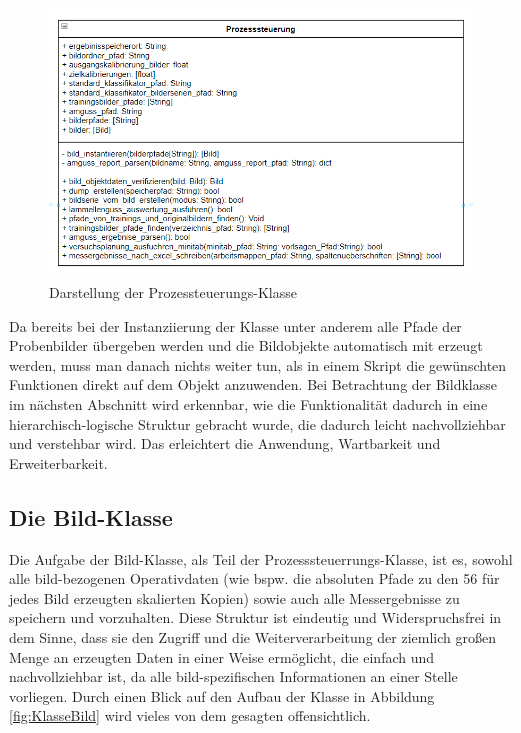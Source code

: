 \documentclass[
fontsize=10pt, 
listof = totoc,
parskip = half	
]{report}
\begin{document}
\begin{figure}[H]
	\centering
	\includegraphics[width=\textwidth, height=\textheight, keepaspectratio]{pics/class_runner}
	\caption{Darstellung der Prozessteuerungs-Klasse}
	\label{fig:KlasseProzessteuerung}
\end{figure}

\noindent Da bereits bei der Instanziierung der Klasse unter anderem alle Pfade der Probenbilder übergeben werden und die Bildobjekte automatisch mit erzeugt werden, muss man danach nichts weiter tun, als in einem Skript die gewünschten Funktionen direkt auf dem Objekt anzuwenden. Bei Betrachtung der Bildklasse im nächsten Abschnitt wird erkennbar, wie die Funktionalität dadurch in eine hierarchisch-logische Struktur gebracht wurde, die dadurch leicht nachvollziehbar und verstehbar wird. Das erleichtert die Anwendung, Wartbarkeit und Erweiterbarkeit.

\subsection{Die Bild-Klasse}

Die Aufgabe der Bild-Klasse, als Teil der Prozesssteuerrungs-Klasse, ist es, sowohl alle bild-bezogenen Operativdaten (wie bspw. die absoluten Pfade zu den 56 für jedes Bild erzeugten skalierten Kopien) sowie auch alle Messergebnisse zu speichern und vorzuhalten. Diese Struktur ist eindeutig und Widerspruchsfrei in dem Sinne, dass sie den Zugriff und die Weiterverarbeitung der ziemlich großen Menge an erzeugten Daten in einer Weise ermöglicht, die einfach und nachvollziehbar ist, da alle bild-spezifischen Informationen an einer Stelle vorliegen. Durch einen Blick auf den Aufbau der Klasse in Abbildung \ref{fig:KlasseBild} wird vieles von dem gesagten offensichtlich.
\end{document}
